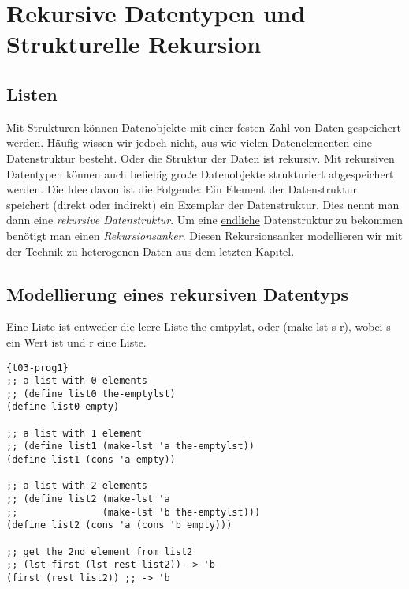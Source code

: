 \chapter{Rekursive Datentypen und Strukturelle Rekursion}
\section{Listen}
Mit Strukturen können Datenobjekte mit einer festen Zahl von Daten gespeichert werden. Häufig wissen wir jedoch nicht, aus wie vielen Datenelementen eine Datenstruktur besteht.
Oder die Struktur der Daten ist rekursiv.
Mit rekursiven Datentypen können auch beliebig große Datenobjekte strukturiert abgespeichert werden. Die Idee davon ist die Folgende: Ein Element der Datenstruktur speichert (direkt oder indirekt) ein Exemplar der Datenstruktur. Dies nennt man dann eine \textit{rekursive Datenstruktur}. Um eine \uline{endliche} Datenstruktur zu bekommen benötigt man einen \textit{Rekursionsanker}. Diesen Rekursionsanker modellieren wir mit der Technik zu heterogenen Daten aus dem letzten Kapitel.

\section{Modellierung eines rekursiven Datentyps}

Eine Liste ist entweder die leere Liste the-emtpylst, oder (make-lst s r), wobei s ein Wert ist und r eine Liste.

\begin{lstlisting}{t03-prog1}
;; a list with 0 elements
;; (define list0 the-emptylst)
(define list0 empty)

;; a list with 1 element
;; (define list1 (make-lst 'a the-emptylst))
(define list1 (cons 'a empty))

;; a list with 2 elements
;; (define list2 (make-lst 'a
;;               (make-lst 'b the-emptylst)))
(define list2 (cons 'a (cons 'b empty)))

;; get the 2nd element from list2
;; (lst-first (lst-rest list2)) -> 'b
(first (rest list2)) ;; -> 'b
\end{lstlisting}
